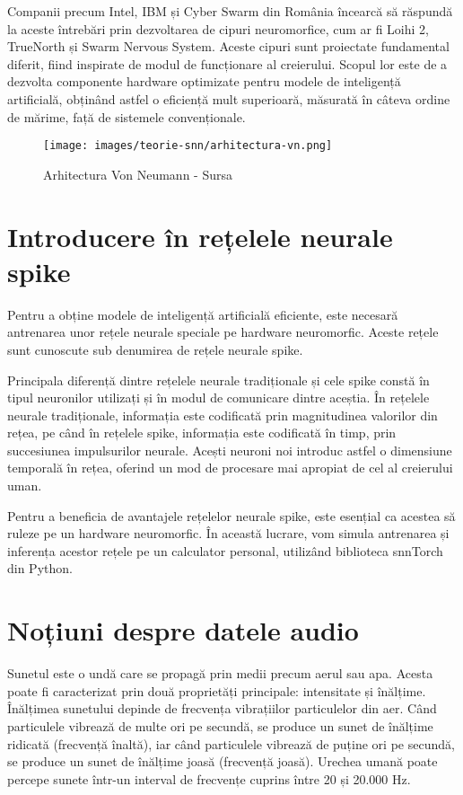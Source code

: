 Companii precum Intel, IBM și Cyber Swarm din România încearcă să răspundă la aceste întrebări prin dezvoltarea de cipuri neuromorfice, cum ar fi Loihi 2, TrueNorth și Swarm 
Nervous System. Aceste cipuri sunt proiectate fundamental diferit, fiind inspirate de modul de funcționare al creierului. Scopul lor este de a dezvolta 
componente hardware optimizate pentru modele de inteligență artificială, obținând astfel o eficiență mult superioară, măsurată în câteva ordine de mărime, 
față de sistemele convenționale.


\begin{figure}
    \centering
    \texttt{[image: images/teorie-snn/arhitectura-vn.png]}
    \caption{Arhitectura Von Neumann - Sursa \cite{VonNeumann}}
    \label{fig:VonNeumannArhitecure}
\end{figure}


\section{Introducere în rețelele neurale spike}

Pentru a obține modele de inteligență artificială eficiente, este necesară antrenarea unor rețele neurale speciale pe hardware neuromorfic. Aceste rețele sunt cunoscute sub denumirea de rețele neurale spike.

Principala diferență dintre rețelele neurale tradiționale și cele spike constă în tipul neuronilor utilizați și în modul de comunicare dintre aceștia. În rețelele neurale tradiționale, informația este codificată prin magnitudinea valorilor din rețea, pe când în rețelele spike, informația este codificată în timp, prin succesiunea impulsurilor neurale. Acești neuroni noi introduc astfel o dimensiune temporală în rețea, oferind un mod de procesare mai apropiat de cel al creierului uman.

Pentru a beneficia de avantajele rețelelor neurale spike, este esențial ca acestea să ruleze pe un hardware neuromorfic. În această lucrare, vom simula antrenarea și inferența acestor rețele pe un calculator personal, utilizând biblioteca snnTorch din Python.


\section{Noțiuni despre datele audio}

Sunetul este o undă care se propagă prin medii precum aerul sau apa. Acesta poate fi caracterizat prin două proprietăți principale: intensitate și înălțime. Înălțimea sunetului depinde de frecvența vibrațiilor particulelor din aer. Când particulele vibrează de multe ori pe secundă, se produce un sunet de înălțime ridicată (frecvență înaltă), iar când particulele vibrează de puține ori pe secundă, se produce un sunet de înălțime joasă (frecvență joasă). Urechea umană poate percepe sunete într-un interval de frecvențe cuprins între 20 și 20.000 Hz.

